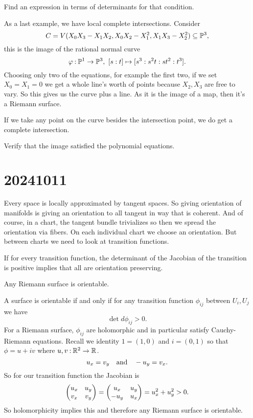 \documentclass[12pt]{memoir}
\begin{document}
\begin{Ej}
    Find an expression in terms of determinants for that condition.
\end{Ej}

\begin{Ex}
    As a last example, we have local complete intersections. Consider
    $$C=V(X_0X_3-X_1X_2,X_0X_2-X_1^2,X_1X_3-X_2^2)\subseteq\mathbb{P}^3,$$
    this is the image of the rational normal curve 
    $$\vf\:\bP^1\to\bP^3,\ [s:t]\mapsto[s^3:s^2t:st^2:t^3].$$
    Choosing only two of the equations, for example the first two, if we set $X_0=X_1=0$ we get a whole line's worth of points because $X_2,X_3$ are free to vary. So this gives us the curve plus a line. As it is the image of a map, then it's a Riemann surface.\par
    If we take any point on the curve besides the intersection point, we do get a complete intersection.
\end{Ex}

\begin{Ej}
    Verify that the image satisfied the polynomial equations.
\end{Ej}

\section{20241011}

Every space is locally approximated by tangent spaces. So giving orientation of manifolds is giving an orientation to all tangent in way that is coherent. And of course, in a chart, the tangent bundle trivializes so then we spread the orientation via fibers. On each individual chart we choose an orientation. But between charts we need to look at transition functions.\par
If for every transition function, the determinant of the Jacobian of the transition is positive implies that all are orientation preserving.

\begin{Lem}
Any Riemann surface is orientable.
\end{Lem}

\begin{ptcbp}
A surface is orientable if and only if for any transition function $\phi_{ij}$ between $U_i,U_j$ we have 
$$\det d\phi_{ij}>0.$$
For a Riemann surface, $\phi_{ij}$ are holomorphic and in particular satisfy Cauchy-Riemann equations. Recall we identity $1=(1,0)$ and $i=(0,1)$ so that $\phi=u+iv$ where $u,v\mathbin{:}\mathbb{R}^2\to\mathbb{R}$. 
$$u_x=v_y\quad\text{and}\quad-u_y=v_x.$$
So for our transition function the Jacobian is 
$$\begin{pmatrix} u_x & u_y \\ v_x & v_y \end{pmatrix}=\begin{pmatrix} u_x & u_y \\ -u_y & u_x \end{pmatrix}=u_x^2+u_y^2>0.$$
So holomorphicity implies this and therefore any Riemann surface is orientable. 
\end{ptcbp}
\end{document}
